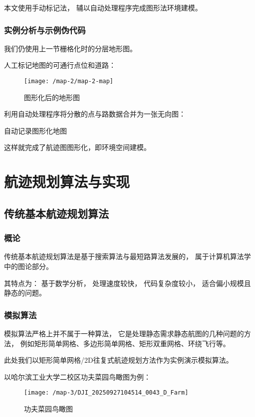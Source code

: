 \documentclass[12pt,a4paper,oneside,UTF8]{ctexart}
\begin{document}
本文使用手动标记法，
辅以自动处理程序完成图形法环境建模。
\subsubsection{实例分析与示例伪代码}
我们仍使用上一节栅格化时的分层地形图。

人工标记地图的可通行点位和道路：
\begin{figure}[H]
  \centering
  \texttt{[image: /map-2/map-2-map]}
  \caption{图形化后的地形图}
  \label{fig:map-2-map}
\end{figure}

利用自动处理程序将分散的点与路数据合并为一张无向图：

\begin{algorithm}[H]
  \caption{自动记录图形化地图}\label{algorithm-map-noted}

\end{algorithm}

这样就完成了航迹图图形化，即环境空间建模。
\newpage\section{航迹规划算法与实现}
\subsection{传统基本航迹规划算法}
\subsubsection{概论}
传统基本航迹规划算法是基于搜索算法与最短路算法发展的，
属于计算机算法学中的图论部分。

其特点为：
基于数学分析，
处理速度较快，
代码复杂度较小，
适合偏小规模且静态的问题。

\subsubsection{模拟算法}
模拟算法严格上并不属于一种算法，
它是处理静态需求静态航图的几种问题的方法，
例如矩形简单网格、多边形简单网格、矩形双重网格、环绕飞行等。

此处我们以矩形简单网格/2D往复式航迹规划方法作为实例演示模拟算法。

以哈尔滨工业大学二校区功夫菜园鸟瞰图为例：
\begin{figure}[H]
  \centering
  \texttt{[image: /map-3/DJI\_20250927104514\_0043\_D\_Farm]}
  \caption{功夫菜园鸟瞰图}
  \label{fig:map-3-farm}
\end{figure}
\end{document}
